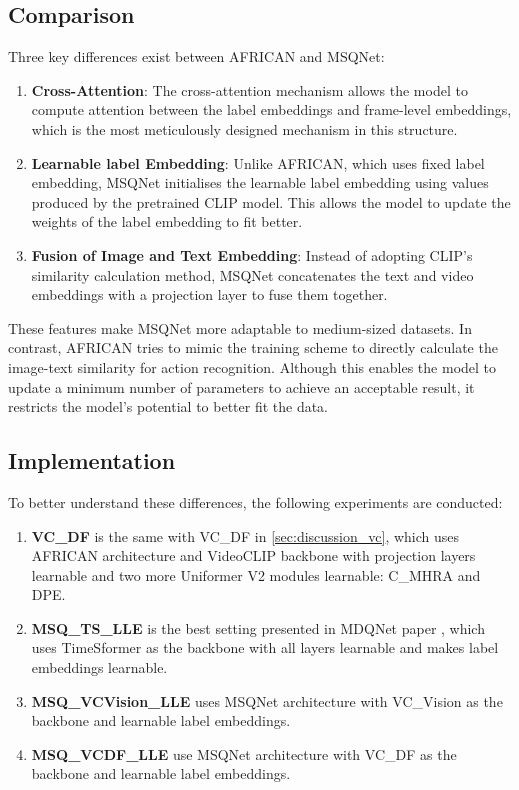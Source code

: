 \subsection{Comparison}
Three key differences exist between AFRICAN and MSQNet: 

\begin{enumerate}
    \item \textbf{Cross-Attention}: The cross-attention mechanism allows the model to compute attention between the label embeddings and frame-level embeddings, which is the most meticulously designed mechanism in this structure.
    \item \textbf{Learnable label Embedding}: Unlike AFRICAN, which uses fixed label embedding, MSQNet initialises the learnable label embedding using values produced by the pretrained CLIP model. This allows the model to update the weights of the label embedding to fit better.
    \item \textbf{Fusion of Image and Text Embedding}: Instead of adopting CLIP's similarity calculation method, MSQNet concatenates the text and video embeddings with a projection layer to fuse them together. 
\end{enumerate}

These features make MSQNet more adaptable to medium-sized datasets. In contrast, AFRICAN tries to mimic the training scheme to directly calculate the image-text similarity for action recognition. Although this enables the model to update a minimum number of parameters to achieve an acceptable result, it restricts the model's potential to better fit the data. 

\subsection{Implementation}
To better understand these differences, the following experiments are conducted: 

\begin{enumerate}
    \item \textbf{VC\_DF} is the same with VC\_DF in \ref{sec:discussion_vc}, which uses AFRICAN architecture and VideoCLIP backbone with projection layers learnable and two more Uniformer V2 modules learnable: C\_MHRA and DPE.
    \item \textbf{MSQ\_TS\_LLE} is the best setting presented in MDQNet paper \parencite{mondal2023msqnet}, which uses TimeSformer as the backbone with all layers learnable and makes label embeddings learnable. 
    \item \textbf{MSQ\_VCVision\_LLE} uses MSQNet architecture with VC\_Vision as the backbone and learnable label embeddings. 
    \item \textbf{MSQ\_VCDF\_LLE} use MSQNet architecture with VC\_DF as the backbone and learnable label embeddings. 
\end{enumerate}

